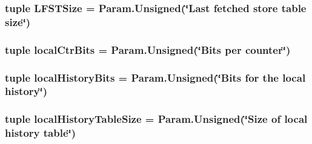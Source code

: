 \label{classSimpleOzoneCPU_1_1SimpleOzoneCPU_a1e02adcb8a1e64fc82f4b389844d2f68}
\hypertarget{classSimpleOzoneCPU_1_1SimpleOzoneCPU_ae8cdf1f1e20a08d0b3200297a9da7d60}{
\subsubsection[{LFSTSize}]{\setlength{\rightskip}{0pt plus 5cm}tuple {\bf LFSTSize} = Param.Unsigned(\char`\"{}Last fetched store table size\char`\"{})}}
\label{classSimpleOzoneCPU_1_1SimpleOzoneCPU_ae8cdf1f1e20a08d0b3200297a9da7d60}
\hypertarget{classSimpleOzoneCPU_1_1SimpleOzoneCPU_a2da1de2b433849a9666f13cf821c1539}{
\subsubsection[{localCtrBits}]{\setlength{\rightskip}{0pt plus 5cm}tuple {\bf localCtrBits} = Param.Unsigned(\char`\"{}Bits per counter\char`\"{})}}
\label{classSimpleOzoneCPU_1_1SimpleOzoneCPU_a2da1de2b433849a9666f13cf821c1539}
\hypertarget{classSimpleOzoneCPU_1_1SimpleOzoneCPU_abc8222dc26502ccba1f3eadbb2663bc0}{
\subsubsection[{localHistoryBits}]{\setlength{\rightskip}{0pt plus 5cm}tuple {\bf localHistoryBits} = Param.Unsigned(\char`\"{}Bits for the local history\char`\"{})}}
\label{classSimpleOzoneCPU_1_1SimpleOzoneCPU_abc8222dc26502ccba1f3eadbb2663bc0}
\hypertarget{classSimpleOzoneCPU_1_1SimpleOzoneCPU_a711db16eca8627517aca59fb2aa5565b}{
\subsubsection[{localHistoryTableSize}]{\setlength{\rightskip}{0pt plus 5cm}tuple {\bf localHistoryTableSize} = Param.Unsigned(\char`\"{}Size of local history table\char`\"{})}}
